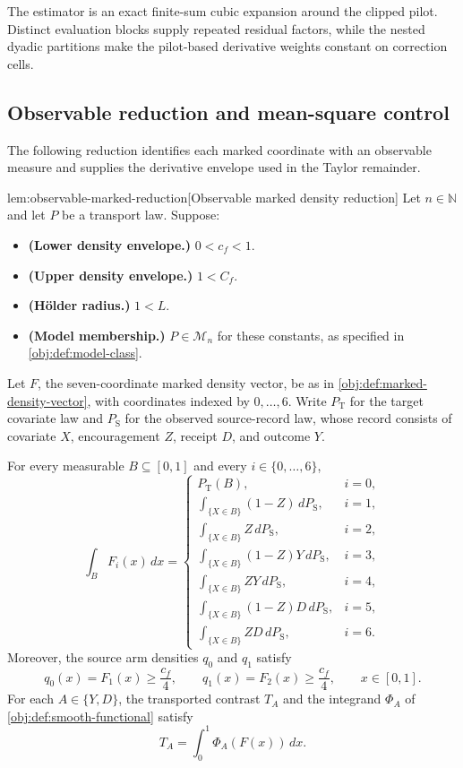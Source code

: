 The estimator is an exact finite-sum cubic expansion around the clipped pilot. Distinct evaluation blocks supply repeated residual factors, while the nested dyadic partitions make the pilot-based derivative weights constant on correction cells.

\subsection{Observable reduction and mean-square control}

The following reduction identifies each marked coordinate with an observable measure and supplies the derivative envelope used in the Taylor remainder.

\begin{lemmav}{lem:observable-marked-reduction}[Observable marked density reduction]
Let \(n\in\mathbb N\) and let \(P\) be a transport law. Suppose:
\begin{itemize}
\item \textbf{(Lower density envelope.)} \(0<c_f<1\).
\item \textbf{(Upper density envelope.)} \(1<C_f\).
\item \textbf{(Hölder radius.)} \(1<L\).
\item \textbf{(Model membership.)} \(P\in\mathcal M_n\) for these constants, as specified in \cref{obj:def:model-class}.
\end{itemize}
Let \(F\), the seven-coordinate marked density vector, be as in \cref{obj:def:marked-density-vector}, with coordinates indexed by \(0,\ldots,6\). Write \(P_{\mathrm T}\) for the target covariate law and \(P_{\mathrm S}\) for the observed source-record law, whose record consists of covariate \(X\), encouragement \(Z\), receipt \(D\), and outcome \(Y\).

For every measurable \(B\subseteq[0,1]\) and every \(i\in\{0,\ldots,6\}\),
\[
\int_B F_i(x)\,dx
=
\begin{cases}
P_{\mathrm T}(B), & i=0,\\
\displaystyle\int_{\{X\in B\}}(1-Z)\,dP_{\mathrm S}, & i=1,\\
\displaystyle\int_{\{X\in B\}}Z\,dP_{\mathrm S}, & i=2,\\
\displaystyle\int_{\{X\in B\}}(1-Z)Y\,dP_{\mathrm S}, & i=3,\\
\displaystyle\int_{\{X\in B\}}ZY\,dP_{\mathrm S}, & i=4,\\
\displaystyle\int_{\{X\in B\}}(1-Z)D\,dP_{\mathrm S}, & i=5,\\
\displaystyle\int_{\{X\in B\}}ZD\,dP_{\mathrm S}, & i=6.
\end{cases}
\]
Moreover, the source arm densities \(q_0\) and \(q_1\) satisfy
\[
q_0(x)=F_1(x)\ge \frac{c_f}{4},
\qquad
q_1(x)=F_2(x)\ge \frac{c_f}{4},
\qquad x\in[0,1].
\]
For each \(A\in\{Y,D\}\), the transported contrast \(T_A\) and the integrand \(\Phi_A\) of \cref{obj:def:smooth-functional} satisfy
\[
T_A=\int_0^1\Phi_A(F(x))\,dx.
\]


\end{lemmav}
